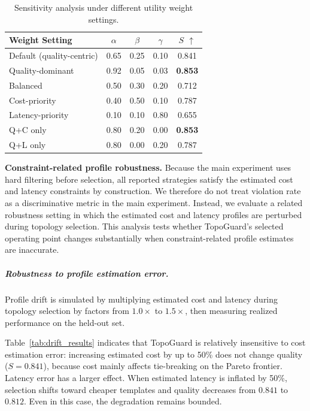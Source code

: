 \documentclass[manuscript,review,anonymous]{acmart}
\begin{document}
\begin{table}[t]
\centering
\caption{Sensitivity analysis under different utility weight settings.}
\label{tab:sensitivity_simple}
\small
\begin{tabular}{lcccc}
\toprule
\textbf{Weight Setting} & $\alpha$ & $\beta$ & $\gamma$ & \textbf{$S$ $\uparrow$} \\
\midrule
Default (quality-centric) & 0.65 & 0.25 & 0.10 & 0.841 \\
Quality-dominant         & 0.92 & 0.05 & 0.03 & \textbf{0.853} \\
Balanced                 & 0.50 & 0.30 & 0.20 & 0.712 \\
Cost-priority             & 0.40 & 0.50 & 0.10 & 0.787 \\
Latency-priority          & 0.10 & 0.10 & 0.80 & 0.655 \\
Q+C only                  & 0.80 & 0.20 & 0.00 & \textbf{0.853} \\
Q+L only                  & 0.80 & 0.00 & 0.20 & 0.787 \\
\bottomrule
\end{tabular}
\end{table}

\textbf{Constraint-related profile robustness.} Because the main experiment uses hard filtering before selection, all reported strategies satisfy the estimated cost and latency constraints by construction. We therefore do not treat violation rate as a discriminative metric in the main experiment. Instead, we evaluate a related robustness setting in which the estimated cost and latency profiles are perturbed during topology selection. This analysis tests whether TopoGuard's selected operating point changes substantially when constraint-related profile estimates are inaccurate.


\subparagraph{Robustness to profile estimation error.}
Profile drift is simulated by multiplying estimated cost and latency during topology selection by factors from $1.0\times$ to $1.5\times$, then measuring realized performance on the held-out set.

Table~\ref{tab:drift_results} indicates that TopoGuard is relatively insensitive to cost estimation error: increasing estimated cost by up to 50\% does not change quality ($S=0.841$), because cost mainly affects tie-breaking on the Pareto frontier. Latency error has a larger effect. When estimated latency is inflated by 50\%, selection shifts toward cheaper templates and quality decreases from $0.841$ to $0.812$. Even in this case, the degradation remains bounded.
\end{document}
